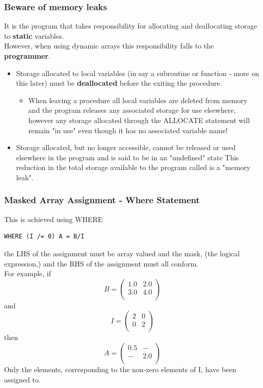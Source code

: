 \documentclass[11pt]{beamer}
\begin{document}
\begin{frame}[fragile]
\frametitle{Beware of memory leaks}

It is the program that takes responsibility for allocating and deallocating storage to \textbf{static} variables.\\
However, when using dynamic arrays this responsibility falls to the \textbf{programmer}. 

\begin{itemize}
\item Storage allocated to local variables (in say a subroutine or function - more on this later) must be \textbf{deallocated} before the exiting the procedure. 
\begin{itemize}
\item When leaving a procedure all local variables are deleted from memory and the program releases any associated storage for use elsewhere, however any storage allocated through the ALLOCATE statement will remain "in use" even though it has no associated variable name!
 \end{itemize}
\item Storage allocated, but no longer accessible, cannot be released or used elsewhere in the program and is said to be in an "undefined" state This reduction in the total storage available to the program called is a "memory leak".
 \end{itemize}


\end{frame}



\begin{frame}[fragile]
\frametitle{Masked Array Assignment - Where Statement}

\footnotesize{
This is achieved using WHERE
 \begin{lstlisting}[style=Fortran]
WHERE (I /= 0) A = B/I
 \end{lstlisting}
the LHS of the assignment must be array valued and the mask, (the logical expression,) and the RHS of the assignment must all conform. \\
For example, if 
\[
B = 
 \begin{pmatrix}
  1.0 & 2.0  \\
  3.0 & 4.0  \\
 \end{pmatrix}
 \]
and
\[
I = 
 \begin{pmatrix}
  2 & 0  \\
  0 & 2  \\
 \end{pmatrix}
 \]
then
\[
A = 
 \begin{pmatrix}
  0.5 & -  \\
  - & 2.0  \\
 \end{pmatrix}
 \]
Only the elements, corresponding to the non-zero elements of I, have been assigned to.
}

\end{frame}
\end{document}
